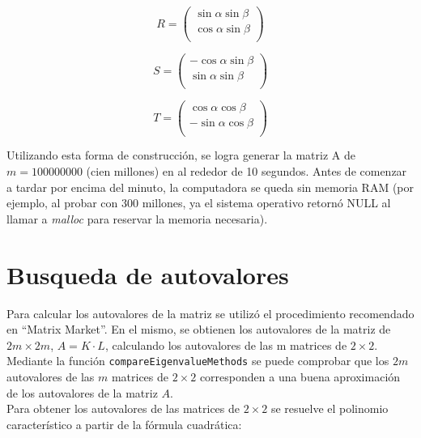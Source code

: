 \documentclass[a4paper,11pt]{article}
\begin{document}
\begin{equation} \label{matrizR}
R =
\left( \begin{array}{cccc}
\sin \alpha \sin \beta\\
\cos \alpha \sin \beta\\
\end{array} \right)
\end{equation}

\begin{equation} \label{matrizS}
S =
\left( \begin{array}{cccc}
-\cos \alpha \sin \beta\\
\sin \alpha \sin \beta\\
\end{array} \right)
\end{equation}

\begin{equation} \label{matrizT}
T =
\left( \begin{array}{cccc}
\cos \alpha \cos \beta\\
-\sin \alpha \cos \beta\\
\end{array} \right)
\end{equation}

Utilizando esta forma de construcción, se logra generar la matriz A de $m =
100000000$ (cien millones) en al rededor de 10 segundos. Antes de comenzar a
tardar por encima del minuto, la computadora se queda sin memoria RAM (por ejemplo,
al probar con 300 millones, ya el sistema operativo retorn\'o NULL al llamar
a \emph{malloc} para reservar la memoria necesaria).

\newpage
\section{Busqueda de autovalores}
Para calcular los autovalores de la matriz se utilizó el procedimiento
recomendado en ``Matrix Market''. En el mismo, se obtienen los autovalores de la
matriz de $2m \times 2m$, $A = K \cdot L$, calculando los autovalores de las m matrices de
$2 \times 2$. \\

Mediante la función \verb+compareEigenvalueMethods+ se puede comprobar que los $2m$
autovalores de las $m$ matrices de $2 \times 2$ corresponden a una buena
aproximación de los autovalores de la matriz $A$. \\

Para obtener los autovalores de las matrices de $2 \times 2$ se resuelve el polinomio
característico a partir de la fórmula cuadrática:
\end{document}

